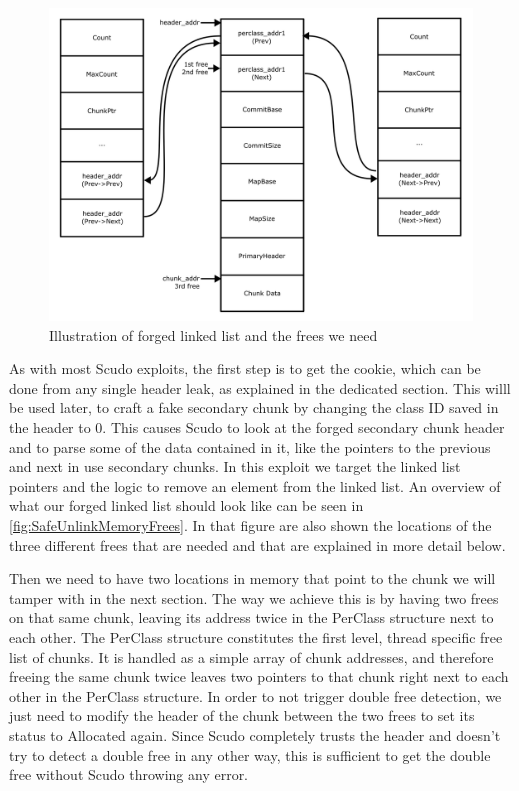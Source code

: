 \documentclass[a4paper,11pt,oneside]{report}
\begin{document}
\begin{figure}[h!]
  \centering
  \includegraphics[width=\linewidth]{figures/SafeUnlinkMemoryFrees.png}
  \caption{Illustration of forged linked list and the frees we
    need}\label{fig:SafeUnlinkMemoryFrees}
\end{figure}

As with most Scudo exploits, the first step is to get the cookie, which can be done from
any single header leak, as explained in the dedicated section. This willl be used later,
to craft a fake secondary chunk by changing the class ID saved in the header to 0. This
causes Scudo to look at the forged secondary chunk header and to parse some of the data
contained in it, like the pointers to the previous and next in use secondary chunks. In
this exploit we target the linked list pointers and the logic to remove an element from
the linked list. An overview of what our forged linked list should look like can be seen
in \autoref{fig:SafeUnlinkMemoryFrees}. In that figure are also shown the locations of the
three different frees that are needed and that are explained in more detail below.

Then we need to have two locations in memory that point to the chunk we will tamper with
in the next section. The way we achieve this is by having two frees on that same chunk,
leaving its address twice in the PerClass structure next to each other. The PerClass
structure constitutes the first level, thread specific free list of chunks. It is handled
as a simple array of chunk addresses, and therefore freeing the same chunk twice leaves
two pointers to that chunk right next to each other in the PerClass structure. In order to
not trigger double free detection, we just need to modify the header of the chunk between
the two frees to set its status to Allocated again. Since Scudo completely trusts the
header and doesn't try to detect a double free in any other way, this is sufficient to get
the double free without Scudo throwing any error.
\end{document}
